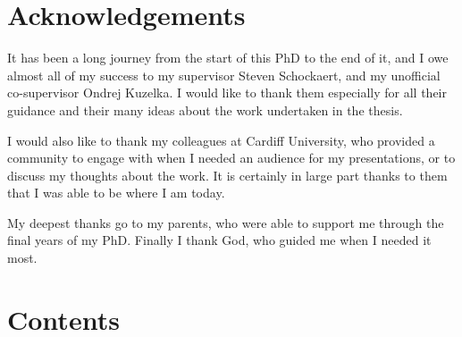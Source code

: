 \documentclass[a4paper,oneside,onecolumn,openright,12pt]{book}
\makeatletter
\def\baselinestretch{1.5}
\def\contentsname{Contents}
\renewcommand\tableofcontents{%
    \if@twocolumn%
      \@restonecoltrue\onecolumn%
    \else%
      \@restonecolfalse%
    \fi%
    \chapter*{\contentsname}%
    \@starttoc{toc}%
    \if@restonecol\twocolumn\fi%
    }
\newcounter{algorithm}[chapter]
\newcommand\listalgorithmsname{List of Algorithms}
\newcommand\listofalgorithms{%
    \if@twocolumn
      \@restonecoltrue\onecolumn
    \else
      \@restonecolfalse
    \fi
    \chapter*{\listalgorithmsname}%
      \@mkboth{\listalgorithmsname}{\listalgorithmsname}%
    \@starttoc{loa}%
    \if@restonecol\twocolumn\fi
    }
\renewcommand\listoffigures{%
    \if@twocolumn
      \@restonecoltrue\onecolumn
    \else
      \@restonecolfalse
    \fi
    \chapter*{\listfigurename}%
      \@mkboth{\listfigurename}{\listfigurename}%
    \@starttoc{lof}%
    \if@restonecol\twocolumn\fi
    }
\renewcommand\listoftables{%
    \if@twocolumn
      \@restonecoltrue\onecolumn
    \else
      \@restonecolfalse
    \fi
    \chapter*{\listtablename}%
      \@mkboth{\listtablename}{\listtablename}%
    \@starttoc{lot}%
    \if@restonecol\twocolumn\fi
    }
\makeatother
\begin{document}
  















\def\baselinestretch{1.5}\normalfont


\chapter*{Acknowledgements}

It has been a long journey from the start of this PhD to the end of it, and I owe almost all of my success to my supervisor Steven Schockaert, and my unofficial co-supervisor Ondrej Kuzelka. I would like to thank them especially for all their guidance and their many ideas about the work undertaken in the thesis.

I would also like to thank my colleagues at Cardiff University, who provided a community to engage with when I needed an audience for my presentations, or to discuss my thoughts about the work. It is certainly in large part thanks to them that I was able to be where I am today.

My deepest thanks go to my parents, who were able to support me through the final years of my PhD. Finally I thank God, who guided me when I needed it most.

\tableofcontents



\listoffigures

\listoftables


%

\mainmatter







\backmatter 



\end{document}
